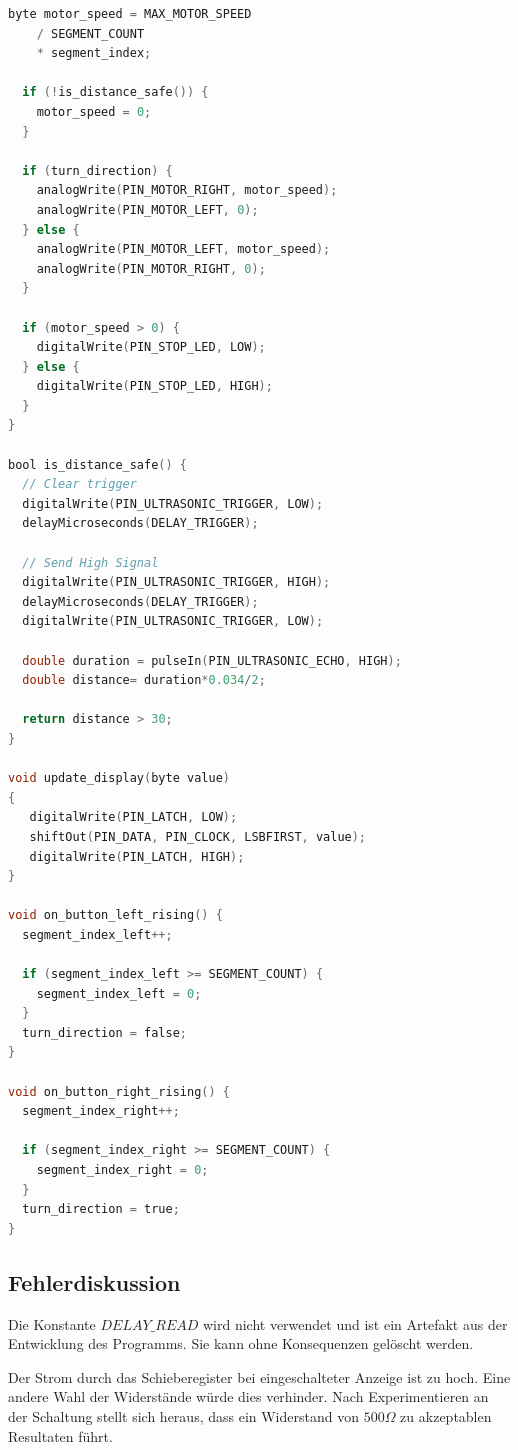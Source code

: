 \begin{lstlisting}[language=C,label={lst:a6-programmcode}, caption={Vollständiger Programmcode der Aufgabe 6}]
  byte motor_speed = MAX_MOTOR_SPEED
    / SEGMENT_COUNT
    * segment_index;

  if (!is_distance_safe()) {
    motor_speed = 0;
  }

  if (turn_direction) {
    analogWrite(PIN_MOTOR_RIGHT, motor_speed);
    analogWrite(PIN_MOTOR_LEFT, 0);
  } else {
    analogWrite(PIN_MOTOR_LEFT, motor_speed);
    analogWrite(PIN_MOTOR_RIGHT, 0);
  }

  if (motor_speed > 0) {
    digitalWrite(PIN_STOP_LED, LOW);
  } else {
    digitalWrite(PIN_STOP_LED, HIGH);
  }
}

bool is_distance_safe() {
  // Clear trigger
  digitalWrite(PIN_ULTRASONIC_TRIGGER, LOW);
  delayMicroseconds(DELAY_TRIGGER);

  // Send High Signal
  digitalWrite(PIN_ULTRASONIC_TRIGGER, HIGH);
  delayMicroseconds(DELAY_TRIGGER);
  digitalWrite(PIN_ULTRASONIC_TRIGGER, LOW);

  double duration = pulseIn(PIN_ULTRASONIC_ECHO, HIGH);
  double distance= duration*0.034/2;

  return distance > 30;
}

void update_display(byte value)
{
   digitalWrite(PIN_LATCH, LOW);
   shiftOut(PIN_DATA, PIN_CLOCK, LSBFIRST, value);
   digitalWrite(PIN_LATCH, HIGH);
}

void on_button_left_rising() {
  segment_index_left++;

  if (segment_index_left >= SEGMENT_COUNT) {
    segment_index_left = 0;
  }
  turn_direction = false;
}

void on_button_right_rising() {
  segment_index_right++;

  if (segment_index_right >= SEGMENT_COUNT) {
    segment_index_right = 0;
  }
  turn_direction = true;
}
\end{lstlisting}

\newpage

\subsection{Fehlerdiskussion}
\label{subsec:a6-fehlerdiskussion}

Die Konstante $DELAY\_READ$ wird nicht verwendet und ist ein Artefakt aus der Entwicklung des Programms.
Sie kann ohne Konsequenzen gelöscht werden.

Der Strom durch das Schieberegister bei eingeschalteter Anzeige ist zu hoch.
Eine andere Wahl der Widerstände würde dies verhinder.
Nach Experimentieren an der Schaltung stellt sich heraus, dass ein Widerstand von $500\Omega$ zu akzeptablen Resultaten führt.
